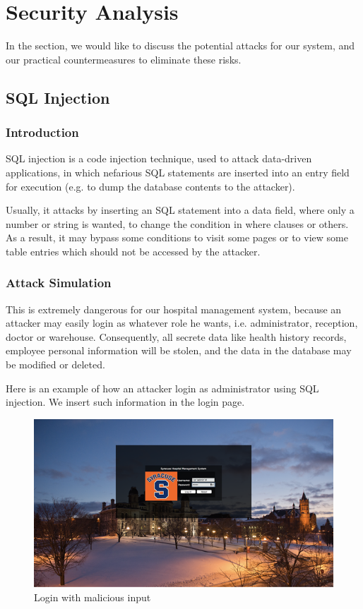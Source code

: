 \section{Security Analysis}
In the section, we would like to discuss the potential attacks for our system, and our practical countermeasures to eliminate these risks. 

\subsection{SQL Injection}
\subsubsection{Introduction}
SQL injection is a code injection technique, used to attack data-driven applications, in which nefarious SQL statements are inserted into an entry field for execution (e.g. to dump the database contents to the attacker). 
 
Usually, it attacks by inserting an SQL statement into a data field, where only a number or string is wanted, to change the condition in where clauses or others. As a result, it may bypass some conditions to visit some pages or to view some table entries which should not be accessed by the attacker. 

\subsubsection{Attack Simulation}
This is extremely dangerous for our hospital management system, because an attacker may easily login as whatever role he wants, i.e. administrator, reception, doctor or warehouse.  Consequently, all secrete data like health history records, employee personal information will be stolen, and the data in the database may be modified or deleted.
 
Here is an example of how an attacker login as administrator using SQL injection. We insert such information in the login page.
\begin{figure}[H]
    \centering
    \includegraphics[width=\textwidth]{sp/sp1.png}
    \caption{Login with malicious input}
    \label{fig:s1}
\end{figure}
 
